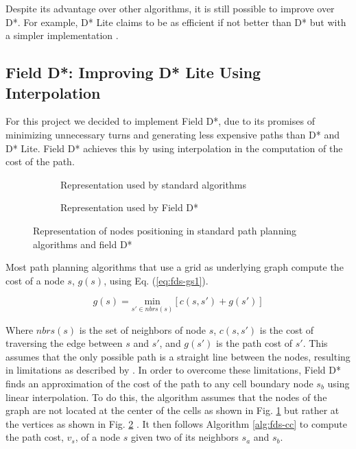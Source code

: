 Despite its advantage over other algorithms, it is still possible to improve over D*. For example, D* Lite 
claims to be as efficient if not better than D* but with a simpler implementation \autocite{SK05}.

\subsection{Field D*: Improving D* Lite Using Interpolation}

For this project we decided to implement Field D*, due to its promises of minimizing unnecessary turns and
generating less expensive paths than D* and D* Lite. Field D* achieves this by using interpolation in the 
computation of the cost of the path. \autocite{DF06}

\begin{figure}
	\begin{center}
		\begin{subfigure}{0.5\textwidth}\centering
			
			\caption{Representation used by standard algorithms}\label{fig:fds-cell-1}
		\end{subfigure}
		\begin{subfigure}{0.4\textwidth}\centering
			
			\caption{Representation used by Field D*}\label{fig:fds-cell-2}
		\end{subfigure}
	\end{center}
	\caption{Representation of nodes positioning in standard path planning algorithms and field D*}\label{fig:fds-cell}
\end{figure}


Most path planning algorithms that use a grid as underlying graph compute the cost of a node $s$, $g(s)$, using 
Eq. (\ref{eq:fds-gs1}).

\begin{equation}
	g(s) = \underset{s' \in nbrs(s)}{\mathrm{min}} [c(s,s') + g(s')]
	\label{eq:fds-gs1}
\end{equation}

Where $nbrs(s)$ is the set of neighbors of node $s$, $c(s,s')$ is the cost of traversing the edge between $s$ and
$s'$, and $g(s')$ is the path cost of $s'$. This assumes that the only possible path is a straight line between
the nodes, resulting in limitations as described by \autocite{DF06}. In order to overcome these limitations,
Field D* finds an approximation of the cost of the path to any cell boundary node $s_b$ using linear interpolation.
To do this, the algorithm assumes that the nodes of the graph are not located at the center of the cells as shown in Fig. \ref{fig:fds-cell-1} but rather
at the vertices as shown in Fig. \ref{fig:fds-cell-2} \autocite{DF06}. It then follows Algorithm \ref{alg:fds-cc} to compute the path cost, $v_s$, of a node $s$ given
two of its neighbors $s_a$ and $s_b$.

